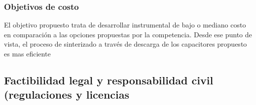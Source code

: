 
  \subsubsection{Objetivos de costo}  
  El objetivo propuesto trata de desarrollar instrumental de bajo o mediano costo en comparación a las opciones propuestas por
  la competencia. Desde ese punto de vista, el proceso de sinterizado a través de descarga de los capacitores propuesto es mas 
  eficiente


  \newpage



  \subsection{Factibilidad legal y responsabilidad civil (regulaciones y licencias}  

  \newpage


